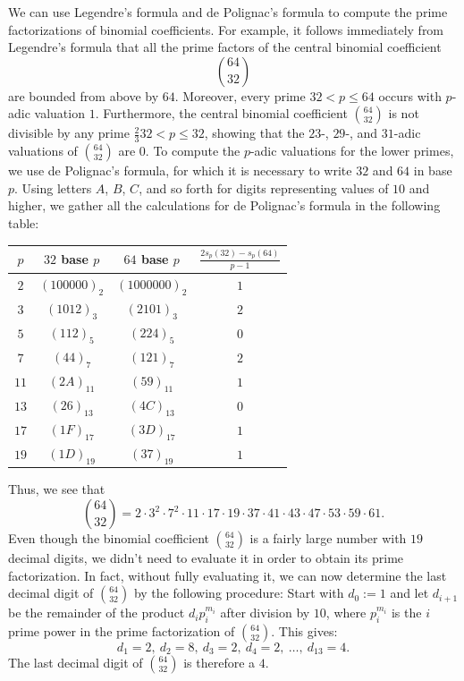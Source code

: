 \begin{example}
  We can use Legendre's formula and de Polignac's formula to compute the prime factorizations of binomial coefficients. For example, it follows immediately from Legendre's formula that all the prime factors of the central binomial coefficient
  \begin{equation*}
    \binom{64}{32}
  \end{equation*}
  are bounded from above by $64$. Moreover, every prime $32<p\leq 64$ occurs with $p$-adic valuation $1$. Furthermore, the central binomial coefficient $\binom{64}{32}$ is not divisible by any prime $\frac{2}{3}32<p\leq 32$, showing that the $23$-, $29$-, and $31$-adic valuations of $\binom{64}{32}$ are $0$. To compute the $p$-adic valuations for the lower primes, we use de Polignac's formula, for which it is necessary to write $32$ and $64$ in base $p$. Using letters $A$, $B$, $C$, and so forth for digits representing values of $10$ and higher, we gather all the calculations for de Polignac's formula in the following table:
  \begin{center}
    \begin{tabular}{c|ccc}
      $p$ & $32$ base $p$ & $64$ base $p$ & $\frac{2s_p(32)-s_p(64)}{p-1}$ \\ \midrule
      $2$ & $(100000)_2$ & $(1000000)_2$ & $1$ \\
      $3$ & $(1012)_3$ & $(2101)_3$ & $2$ \\
      $5$ & $(112)_5$ & $(224)_5$ & $0$ \\
      $7$ & $(44)_7$ & $(121)_7$ & $2$ \\
      $11$ & $(2A)_{11}$ & $(59)_{11}$ & $1$ \\
      $13$ & $(26)_{13}$ & $(4C)_{13}$ & $0$ \\
      $17$ & $(1F)_{17}$ & $(3D)_{17}$ & $1$ \\
      $19$ & $(1D)_{19}$ & $(37)_{19}$ & $1$ \\
    \end{tabular}
  \end{center}
  Thus, we see that
  \begin{equation*}
    \binom{64}{32}=2\cdot 3^2\cdot 7^2\cdot 11\cdot 17\cdot 19\cdot 37\cdot 41\cdot 43\cdot 47\cdot 53\cdot 59\cdot 61.
  \end{equation*}
  Even though the binomial coefficient $\binom{64}{32}$ is a fairly large number with $19$ decimal digits, we didn't need to evaluate it in order to obtain its prime factorization. In fact, without fully evaluating it, we can now determine the last decimal digit of $\binom{64}{32}$ by the following procedure: Start with $d_0:=1$ and let $d_{i+1}$ be the remainder of the product $d_ip_i^{m_i}$ after division by $10$, where $p_i^{m_i}$ is the $i$\supth{} prime power in the prime factorization of $\binom{64}{32}$. This gives:
  \begin{equation*}
    d_1 = 2,~d_2=8,~d_3=2,~d_4=2,~\ldots,~d_{13}=4.
  \end{equation*}
  The last decimal digit of $\binom{64}{32}$ is therefore a $4$.
\end{example}

